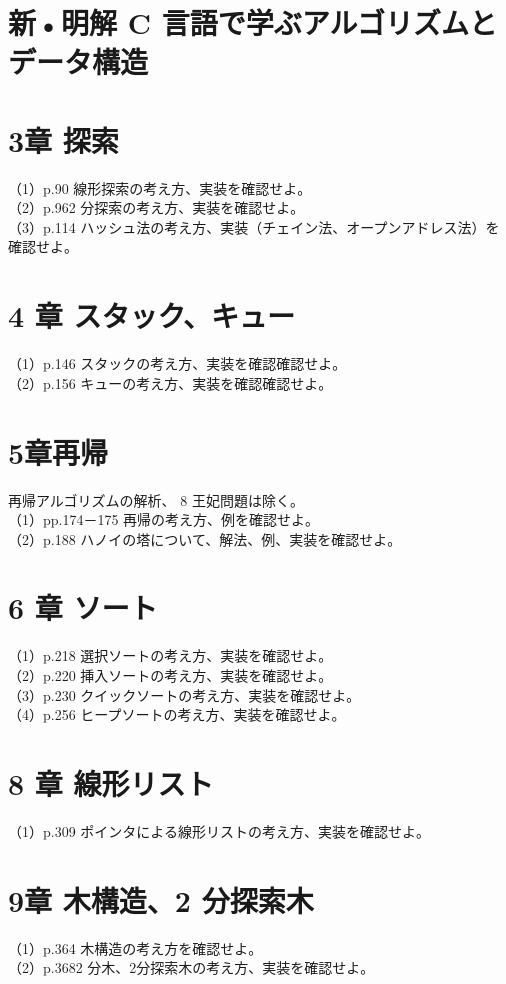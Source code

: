 \documentclass[dvipdfmx]{jreport}
\begin{document}
\section*{新•明解 C 言語で学ぶアルゴリズムとデータ構造}
\section*{3章 探索}
（1）p.90 線形探索の考え方、実装を確認せよ。\\
（2）p.962 分探索の考え方、実装を確認せよ。\\
（3）p.114 ハッシュ法の考え方、実装（チェイン法、オープンアドレス法）を確認せよ。

\section*{4 章 スタック、キュー}
（1）p.146 スタックの考え方、実装を確認確認せよ。\\
（2）p.156 キューの考え方、実装を確認確認せよ。

\section*{5章再帰}
再帰アルゴリズムの解析、 8 王妃問題は除く。\\
（1）pp.174－175 再帰の考え方、例を確認せよ。\\
（2）p.188 ハノイの塔について、解法、例、実装を確認せよ。

\section*{6 章 ソート}
（1）p.218 選択ソートの考え方、実装を確認せよ。\\
（2）p.220 挿入ソートの考え方、実装を確認せよ。\\
（3）p.230 クイックソートの考え方、実装を確認せよ。\\
（4）p.256 ヒープソートの考え方、実装を確認せよ。

\section*{8 章 線形リスト}
（1）p.309 ポインタによる線形リストの考え方、実装を確認せよ。

\section*{9章 木構造、2 分探索木}
（1）p.364 木構造の考え方を確認せよ。\\
（2）p.3682 分木、2分探索木の考え方、実装を確認せよ。
\end{document}
